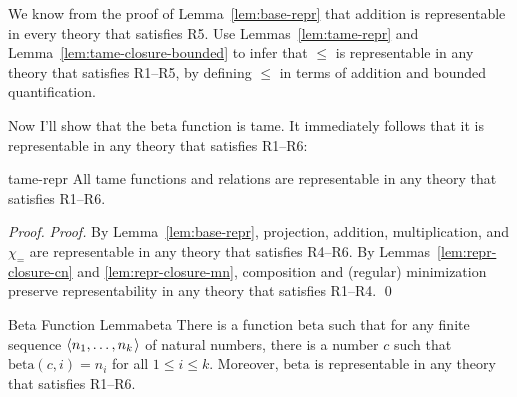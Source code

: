 \begin{exercise}
  We know from the proof of Lemma~\ref{lem:base-repr} that
  addition is representable in every theory that satisfies R5.
  Use Lemmas~\ref{lem:tame-repr} and Lemma~\ref{lem:tame-closure-bounded}
  to infer that $\leq$ is representable in any theory that satisfies R1--R5,
  by defining $\leq$ in terms of addition and bounded quantification.
\end{exercise}

Now I'll show that
the $\mathrm{beta}$ function is tame.
It immediately follows that
it is representable in any theory that satisfies R1--R6:

\begin{lemma}{}{tame-repr}
  All tame functions and relations are representable
  in any theory that satisfies R1--R6.
\end{lemma}
\begin{proof}
  \emph{Proof.}
  By Lemma~\ref{lem:base-repr},
  projection, addition, multiplication, and $\chi_=$ are representable in any theory
  that satisfies R4--R6.
  By Lemmas~\ref{lem:repr-closure-cn} and \ref{lem:repr-closure-mn},
  composition and (regular) minimization preserve representability
  in any theory that satisfies R1--R4.
  \qed
\end{proof}

\begin{lemma}{Beta Function Lemma}{beta}
  There is a function $\mathrm{beta}$ such that
  for any finite sequence $\t{n_{1}, \ldots, n_{k}}$ of natural numbers,
  there is a number $c$ such that
  $\mathrm{beta}(c,i) = n_{i}$ for all $1 \leq i \leq k$.
  Moreover,
  $\mathrm{beta}$ is representable in any theory that satisfies R1--R6.
\end{lemma}

